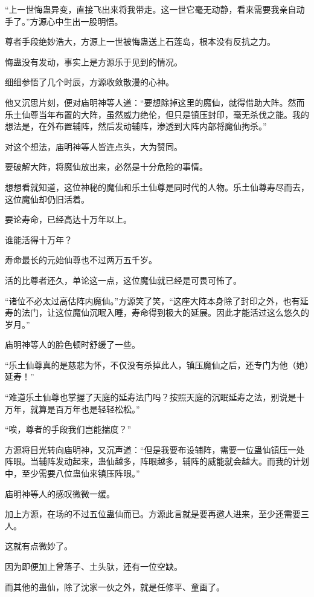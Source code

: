 \begin{this_body}
“上一世悔蛊异变，直接飞出来将我带走。这一世它毫无动静，看来需要我亲自动手了。”方源心中生出一股明悟。

尊者手段绝妙浩大，方源上一世被悔蛊送上石莲岛，根本没有反抗之力。

悔蛊没有发动，事实上是方源乐于见到的情况。

细细参悟了几个时辰，方源收敛散漫的心神。

他又沉思片刻，便对庙明神等人道：“要想除掉这里的魔仙，就得借助大阵。然而乐土仙尊当年布置的大阵，虽然威力绝伦，但只是镇压封印，毫无杀伐之能。我的想法是，在外布置辅阵，然后发动辅阵，渗透到大阵内部将魔仙拘杀。”

对这个想法，庙明神等人皆连点头，大为赞同。

要破解大阵，将魔仙放出来，必然是十分危险的事情。

想想看就知道，这位神秘的魔仙和乐土仙尊是同时代的人物。乐土仙尊寿尽而去，这位魔仙却仍旧活着。

要论寿命，已经高达十万年以上。

谁能活得十万年？

寿命最长的元始仙尊也不过两万五千岁。

活的比尊者还久，单论这一点，这位魔仙就已经是可畏可怖了。

“诸位不必太过高估阵内魔仙。”方源笑了笑，“这座大阵本身除了封印之外，也有延寿的法门，让这位魔仙沉眠入睡，寿命得到极大的延展。因此才能活过这么悠久的岁月。”

庙明神等人的脸色顿时舒缓了一些。

“乐土仙尊真的是慈悲为怀，不仅没有杀掉此人，镇压魔仙之后，还专门为他（她）延寿！”

“难道乐土仙尊也掌握了天庭的延寿法门吗？按照天庭的沉眠延寿之法，别说是十万年，就算是百万年也是轻轻松松。”

“唉，尊者的手段我们岂能揣度？”

方源将目光转向庙明神，又沉声道：“但是我要布设辅阵，需要一位蛊仙镇压一处阵眼。当辅阵发动起来，蛊仙越多，阵眼越多，辅阵的威能就会越大。而我的计划中，至少需要八位蛊仙来镇压阵眼。”

庙明神等人的感叹微微一缓。

加上方源，在场的不过五位蛊仙而已。方源此言就是要再邀人进来，至少还需要三人。

这就有点微妙了。

因为即便加上曾落子、土头驮，还有一位空缺。

而其他的蛊仙，除了沈家一伙之外，就是任修平、童画了。


\end{this_body}
